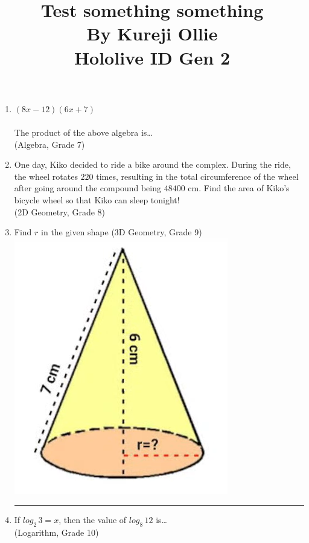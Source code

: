 \documentclass[12pt]{article}
\begin{document}
\begin{enumerate}
  \item $(8x-12)(6x+7)$\\
        \\
        The product of the above algebra is\ldots\\
        (Algebra, Grade 7)\\


  \item One day, Kiko decided to ride a bike around the complex. During the ride, the wheel rotates $220$ times, resulting in the total circumference of the wheel after going around the compound being $48400$ cm. Find the area of Kiko's bicycle wheel so that Kiko can sleep tonight!\\
        (2D Geometry, Grade 8)

  \item Find $r$ in the given shape (3D Geometry, Grade 9) \\
        \includegraphics{3-shape.png}

        \begin{center}
          \title{\textbf{\Large Test something something}\\[1ex]
            \textbf{\LARGE By Kureji Ollie}\\[2ex]
            \textbf{\large Hololive ID Gen 2}}
        \end{center}
        \hrule

  \item If $log_2 \, 3 = x$, then the value of $log_8 \, 12$ is\ldots\\
        (Logarithm, Grade 10)


\end{enumerate}
\end{document}

